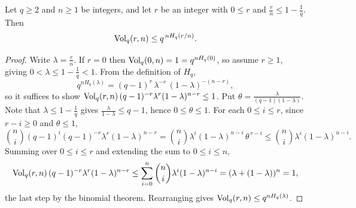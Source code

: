 \begin{lemma}
\label{lemma:VolEntropy}
\leanok
{}
Let $q \geq 2$ and $n \geq 1$ be integers, and let $r$ be an integer with $0 \leq r$ and $\frac{r}{n} \leq 1 - \frac{1}{q}$. Then
\[
  \operatorname{Vol}_q(r, n) \leq q^{\,n H_q(r/n)}.
\]
\end{lemma}
\begin{proof}
  Write $\lambda = \frac{r}{n}$. If $r = 0$ then $\operatorname{Vol}_q(0, n) = 1 = q^{n H_q(0)}$, so assume $r \geq 1$, giving $0 < \lambda \leq 1 - \frac{1}{q} < 1$. From the definition of $H_q$,
  \[
    q^{n H_q(\lambda)} = (q-1)^{r}\, \lambda^{-r}\,(1-\lambda)^{-(n-r)},
  \]
  so it suffices to show $\operatorname{Vol}_q(r,n)\,(q-1)^{-r}\lambda^{r}(1-\lambda)^{n-r} \leq 1$. Put $\theta = \frac{\lambda}{(q-1)(1-\lambda)}$. Note that $\lambda \leq 1 - \frac{1}{q}$ gives $\frac{\lambda}{1-\lambda} \leq q-1$, hence $0 \leq \theta \leq 1$. For each $0 \leq i \leq r$, since $r - i \geq 0$ and $\theta \leq 1$,
  \[
    \binom{n}{i} (q-1)^{i} (q-1)^{-r}\lambda^{r}(1-\lambda)^{n-r} = \binom{n}{i} \lambda^{i} (1-\lambda)^{n-i}\,\theta^{\,r-i} \leq \binom{n}{i} \lambda^{i} (1-\lambda)^{n-i}.
  \]
  Summing over $0 \leq i \leq r$ and extending the sum to $0 \leq i \leq n$,
  \[
    \operatorname{Vol}_q(r,n)\,(q-1)^{-r}\lambda^{r}(1-\lambda)^{n-r} \leq \sum_{i=0}^{n}\binom{n}{i} \lambda^{i}(1-\lambda)^{n-i} = (\lambda + (1-\lambda))^{n} = 1,
  \]
  the last step by the binomial theorem. Rearranging gives $\operatorname{Vol}_q(r,n) \leq q^{n H_q(\lambda)}$.
\end{proof}
